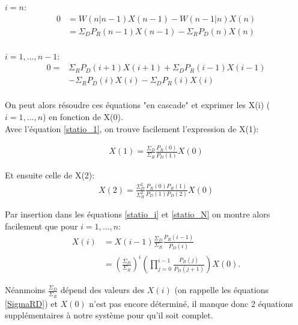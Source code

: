 $i=n$:
\begin{equation}
\begin{aligned}
0 &= W(n|n-1) X(n-1) - W(n-1|n) X(n)\\
  &= \Sigma_D P_R(n-1)X(n-1)- \Sigma_R P_D(n) X(n)\\
 \label{statio_N}
\end{aligned}
\end{equation}

$i=1,...,n-1$:
\begin{equation}
\begin{aligned}
0 =& \Sigma_R P_D(i+1) X(i+1)+ \Sigma_D P_R(i-1) X(i-1)\\ 
	&- \Sigma_R P_D(i) X(i) - \Sigma_D P_R(i) X(i)\\
\label{statio_i}
\end{aligned}
\end{equation}

On peut alors résoudre ces équations "en cascade" et exprimer les X(i) ($i=1,...,n$) en fonction de X(0).\\
Avec l'équation \ref{statio_1}, on trouve facilement l'expression de X(1):

\begin{equation}
\begin{aligned}
X(1) = \frac{\Sigma_D}{\Sigma_R} \frac{P_R(0)}{P_D(1)} X(0)
\end{aligned}
\end{equation}

Et ensuite celle de X(2):
\begin{equation}
\begin{aligned}
X(2) = \frac{\Sigma^2_D}{\Sigma^2_R} \frac{P_R(0)P_R(1)}{P_D(1)P_D(2)} X(0)
\end{aligned}
\end{equation}

Par insertion dans les équations \ref{statio_i} et \ref{statio_N} on montre alors facilement que pour $i = 1,...,n$:
\begin{equation}
\begin{aligned}
X(i)&= X(i-1) \frac{\Sigma_D}{\Sigma_R} \frac{P_R(i-1)}{P_D(i)}  \\ 
	&= (\frac{\Sigma_D}{\Sigma_R})^i (\prod_{j=0}^{i-1} \frac{P_R(j)}{P_D(j+1)}) X(0).
\label{expression_Xi}
\end{aligned}
\end{equation}

Néanmoins $\frac{\Sigma_D}{\Sigma_R}$ dépend des valeurs des $X(i)$ (on rappelle les équations \ref{SigmaRD}) et $X(0)$ n'est pas encore déterminé, il manque donc 2 équations supplémentaires à notre système pour qu'il soit complet.\\

